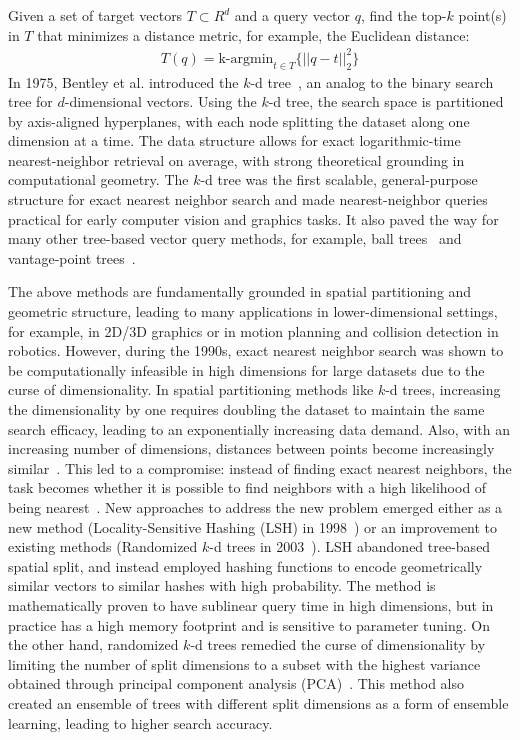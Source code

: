 \documentclass[twoside,a4paper]{master}
\begin{document}
Given a set of target vectors \(T \subset R^d\) and a query vector \(q\), find the top-\(k\) point(s) in \(T\) that minimizes a distance metric, for example, the Euclidean distance:
\begin{align}
    T(q) = \text{k-argmin}_{t \in T} \{||q-t||_2^2\}
\end{align}
In 1975, Bentley et al. introduced the \(k\)-d tree~\cite{10.1145/361002.361007}, an analog to the binary search tree for \(d\)-dimensional vectors. Using the \(k\)-d tree, the search space is partitioned by axis-aligned hyperplanes, with each node splitting the dataset along one dimension at a time. The data structure allows for exact logarithmic-time nearest-neighbor retrieval on average, with strong theoretical grounding in computational geometry. The \(k\)-d tree was the first scalable, general-purpose structure for exact nearest neighbor search and made nearest-neighbor queries practical for early computer vision and graphics tasks. It also paved the way for many other tree-based vector query methods, for example, ball trees~\cite{Omohundro2009FiveBC} and vantage-point trees~\cite{10.5555/313559.313789}.

The above methods are fundamentally grounded in spatial partitioning and geometric structure, leading to many applications in lower-dimensional settings, for example, in 2D/3D graphics or in motion planning and collision detection in robotics. However, during the 1990s, exact nearest neighbor search was shown to be computationally infeasible in high dimensions for large datasets due to the curse of dimensionality. In spatial partitioning methods like \(k\)-d trees, increasing the dimensionality by one requires doubling the dataset to maintain the same search efficacy, leading to an exponentially increasing data demand. Also, with an increasing number of dimensions, distances between points become increasingly similar~\cite{nearestneighbormeaning}. This led to a compromise: instead of finding exact nearest neighbors, the task becomes whether it is possible to find neighbors with a high likelihood of being nearest~\cite{indyk1998approximate}. New approaches to address the new problem emerged either as a new method (Locality-Sensitive Hashing (LSH) in 1998~\cite{indyk1998approximate}) or an improvement to existing methods (Randomized \(k\)-d trees in 2003~\cite{4587638}). LSH abandoned tree-based spatial split, and instead employed hashing functions to encode geometrically similar vectors to similar hashes with high probability. The method is mathematically proven to have sublinear query time in high dimensions, but in practice has a high memory footprint and is sensitive to parameter tuning. On the other hand, randomized \(k\)-d trees remedied the curse of dimensionality by limiting the number of split dimensions to a subset with the highest variance obtained through principal component analysis (PCA)~\cite{jolliffe2002pca}. This method also created an ensemble of trees with different split dimensions as a form of ensemble learning, leading to higher search accuracy.
\end{document}
